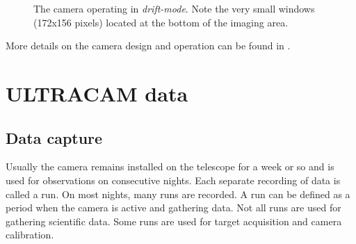 \begin{figure}  
  \centering
  \setlength{\fboxsep}{0pt}
  \setlength{\fboxrule}{1pt}
  \caption{The camera operating in \emph{drift-mode}. Note the very small windows (172x156 pixels) located at the bottom of the imaging area.}
  \label{fig:V834Cen}
\end{figure}

More details on the camera design and operation can be found in \citet{dhillon07}.

\section{ULTRACAM data}

\subsection{Data capture}
Usually the camera remains installed on the telescope for a week or so and is used for observations on consecutive nights. Each separate recording of data is called a run. On most nights, many runs are recorded. A run can be defined as a period when the camera is active and gathering data. Not all runs are used for gathering scientific data. Some runs are used for target acquisition and camera calibration. 

